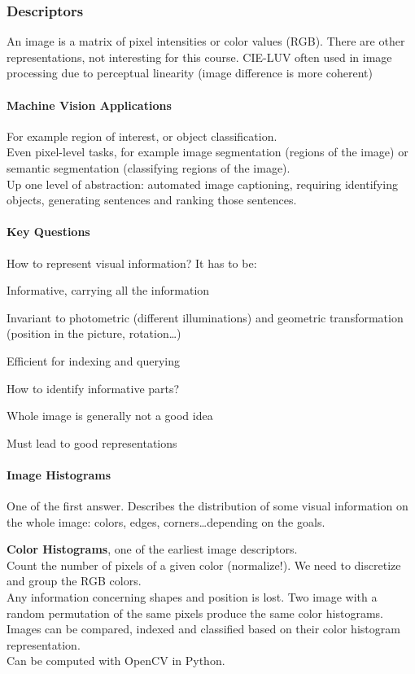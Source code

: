 \documentclass[10pt]{report}
\begin{document}
\subsubsection{Descriptors}
An image is a matrix of pixel intensities or color values (RGB). There are other representations, not interesting for this course. CIE-LUV often used in image processing due to perceptual linearity (image difference is more coherent)
\paragraph{Machine Vision Applications} For example region of interest, or object classification.\\
Even pixel-level tasks, for example image segmentation (regions of the image) or semantic segmentation (classifying regions of the image).\\
Up one level of abstraction: automated image captioning, requiring identifying objects, generating sentences and ranking those sentences.
\paragraph{Key Questions}
\begin{list}{}{}
	\item How to represent visual information? It has to be:\begin{list}{}{}
		\item Informative, carrying all the information
		\item Invariant to photometric (different illuminations) and geometric transformation (position in the picture, rotation\ldots)
		\item Efficient for indexing and querying
	\end{list}
	\item How to identify informative parts?\begin{list}{}{}
		\item Whole image is generally not a good idea
		\item Must lead to good representations
	\end{list}
\end{list}
\paragraph{Image Histograms} One of the first answer. Describes the distribution of some visual information on the whole image: colors, edges, corners\ldots depending on the goals.\begin{list}{}{}
	\item \textbf{Color Histograms}, one of the earliest image descriptors.\\
	Count the number of pixels of a given color (normalize!). We need to discretize and group the RGB colors.\\
	Any information concerning shapes and position is lost. Two image with a random permutation of the same pixels produce the same color histograms.\\
	Images can be compared, indexed and classified based on their color histogram representation.\\
	Can be computed with OpenCV in Python.
\end{list}
\end{document}
